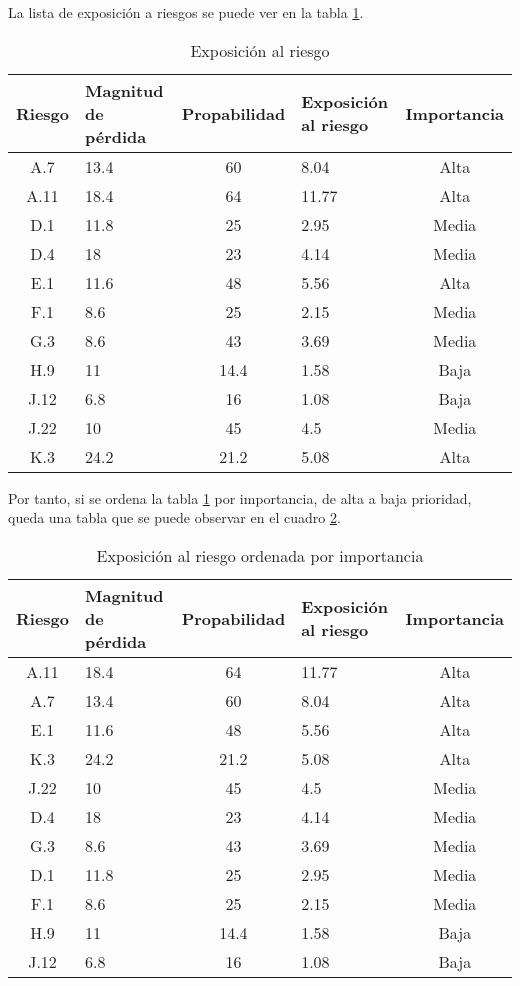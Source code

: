 \documentclass[11pt,a4paper,spanish,twoside]{book}
\begin{document}
La lista de exposición a riesgos se puede ver en la tabla \ref{Tab:Expri}.

\begin{table}[!h]
  \centering
  \begin{tabular}{|c||p{}||c||p{}||c|}
    \hline
    \textbf{Riesgo} & \textbf{Magnitud de pérdida} & \textbf{Propabilidad} & 
    \textbf{Exposición al riesgo} & \textbf{Importancia} \\
    \hline \hline
    A.7 & 13.4 & 60 & 8.04 & Alta \\ 
    \hline
    A.11 & 18.4 & 64 & 11.77 & Alta \\
    \hline 
    D.1 & 11.8 & 25 & 2.95 & Media \\
    \hline
    D.4 & 18 & 23 & 4.14 & Media \\
    \hline
    E.1 & 11.6 & 48 & 5.56 & Alta \\
    \hline
    F.1 & 8.6 & 25 & 2.15 & Media \\
    \hline
    G.3 & 8.6 & 43 & 3.69 & Media \\
    \hline
    H.9 & 11 & 14.4 & 1.58 & Baja \\
    \hline
    J.12 & 6.8 & 16 & 1.08 & Baja \\
    \hline
    J.22 & 10 & 45 & 4.5 & Media \\
    \hline
    K.3 & 24.2 & 21.2 & 5.08 & Alta \\
    \hline
  \end{tabular}
  \caption{Exposición al riesgo} 
  \label{Tab:Expri}
\end{table}

Por tanto, si se ordena la tabla \ref{Tab:Expri} por importancia, de alta a
baja prioridad, queda una tabla que se puede observar en el cuadro
\ref{Tab:Expor}.


\begin{table}[!h]
  \centering
  \begin{tabular}{|c||p{}||c||p{}||c|}
    \hline
    \textbf{Riesgo} & \textbf{Magnitud de pérdida} & \textbf{Propabilidad} & 
    \textbf{Exposición al riesgo} & \textbf{Importancia} \\
    \hline \hline
    A.11 & 18.4 & 64 & 11.77 & Alta \\ 
    \hline
    A.7 & 13.4 & 60 & 8.04 & Alta \\
    \hline 
    E.1 & 11.6 & 48 & 5.56 & Alta \\
    \hline
    K.3 & 24.2 & 21.2 & 5.08 & Alta \\
    \hline
    J.22 & 10 & 45 & 4.5 & Media \\
    \hline
    D.4 & 18 & 23 & 4.14 & Media \\
    \hline
    G.3 & 8.6 & 43 & 3.69 & Media \\
    \hline
    D.1 & 11.8 & 25 & 2.95 & Media \\
    \hline
    F.1 & 8.6 & 25 & 2.15 & Media \\
    \hline
    H.9 & 11 & 14.4 & 1.58 & Baja \\
    \hline
    J.12 & 6.8 & 16 & 1.08 & Baja \\
    \hline
  \end{tabular}
  \caption{Exposición al riesgo ordenada por importancia} 
  \label{Tab:Expor}
\end{table}
\end{document}
